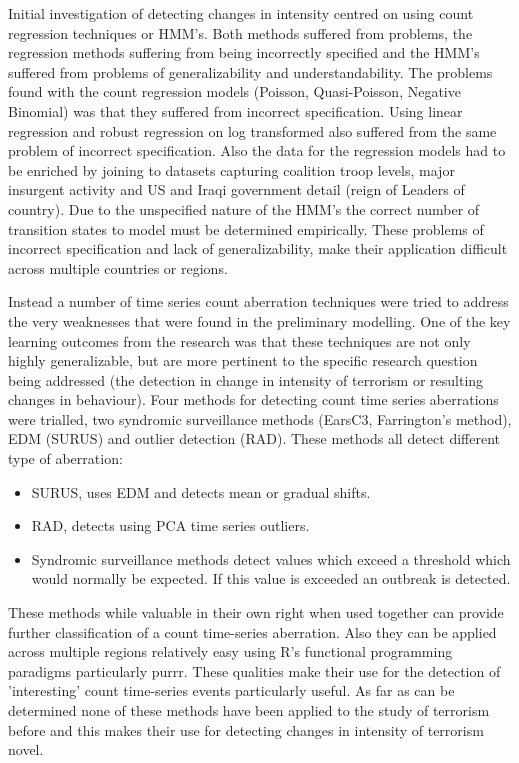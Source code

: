 Initial investigation of detecting changes in intensity centred on using count regression techniques or HMM's. Both methods suffered from problems, the regression methods suffering from being incorrectly specified and the HMM's suffered from problems of generalizability and understandability. The problems found with the count regression models (Poisson, Quasi-Poisson, Negative Binomial) was that they suffered from incorrect specification. Using linear regression  and robust regression on log transformed also suffered from the same problem of incorrect specification. Also the data for the regression models had to be enriched by joining to datasets capturing coalition troop levels, major insurgent activity and US and Iraqi government detail (reign of Leaders of country). Due to the unspecified nature of the HMM's the correct number of transition states to model must be determined empirically. These problems of incorrect specification and lack of generalizability, make their application difficult across multiple countries or regions. 

Instead a number of time series count aberration techniques were tried to address the very weaknesses that were found in the preliminary modelling. One of the key learning outcomes from the research was that these techniques are not only highly generalizable, but are more pertinent to the specific research question being addressed (the detection in change in intensity of terrorism or resulting changes in behaviour). Four methods for detecting count time series aberrations were trialled, two syndromic surveillance methods (EarsC3, Farrington's method), EDM (SURUS) and outlier detection (RAD). These methods all detect different type of aberration:
\begin{itemize}
     \item SURUS, uses EDM and detects mean or gradual shifts.
     \item RAD, detects using PCA time series outliers.
     \item Syndromic surveillance methods detect values which exceed a threshold which would normally be expected. If this value is exceeded an outbreak is detected.
\end{itemize}     

These methods while valuable in their own right when used together can provide further classification of a count time-series aberration. Also they can be applied across multiple regions relatively easy using R's functional programming paradigms particularly purrr. These qualities make their use for the detection of 'interesting' count time-series events particularly useful. As far as can be determined none of these methods have been applied to the study of terrorism before and this makes their use for detecting changes in intensity of terrorism novel.

